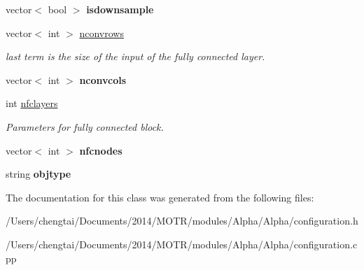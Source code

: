 \begin{DoxyCompactItemize}
\item 
\hypertarget{class_configuration_a3165a9906fec9b9eeffa417c721c2697}{vector$<$ bool $>$ {\bfseries isdownsample}}\label{class_configuration_a3165a9906fec9b9eeffa417c721c2697}

\item 
\hypertarget{class_configuration_a59c0ed2f79b7fff3d69b22ee8684672e}{vector$<$ int $>$ \hyperlink{class_configuration_a59c0ed2f79b7fff3d69b22ee8684672e}{nconvrows}}\label{class_configuration_a59c0ed2f79b7fff3d69b22ee8684672e}

\begin{DoxyCompactList}\small\item\em last term is the size of the input of the fully connected layer. \end{DoxyCompactList}\item 
\hypertarget{class_configuration_a2f32fc6b6a400181adf00dadb7738a5a}{vector$<$ int $>$ {\bfseries nconvcols}}\label{class_configuration_a2f32fc6b6a400181adf00dadb7738a5a}

\item 
\hypertarget{class_configuration_ad1f3df350b8795f714c10ef2c641bdb9}{int \hyperlink{class_configuration_ad1f3df350b8795f714c10ef2c641bdb9}{nfclayers}}\label{class_configuration_ad1f3df350b8795f714c10ef2c641bdb9}

\begin{DoxyCompactList}\small\item\em Parameters for fully connected block. \end{DoxyCompactList}\item 
\hypertarget{class_configuration_af254fa130e77e52b2ce3673ae7d85efe}{vector$<$ int $>$ {\bfseries nfcnodes}}\label{class_configuration_af254fa130e77e52b2ce3673ae7d85efe}

\item 
\hypertarget{class_configuration_ae640a71d6d9eae3cae3304ea4ecc09d0}{string {\bfseries objtype}}\label{class_configuration_ae640a71d6d9eae3cae3304ea4ecc09d0}

\end{DoxyCompactItemize}


The documentation for this class was generated from the following files\+:\begin{DoxyCompactItemize}
\item 
/\+Users/chengtai/\+Documents/2014/\+M\+O\+T\+R/modules/\+Alpha/\+Alpha/configuration.\+h\item 
/\+Users/chengtai/\+Documents/2014/\+M\+O\+T\+R/modules/\+Alpha/\+Alpha/configuration.\+cpp\end{DoxyCompactItemize}
